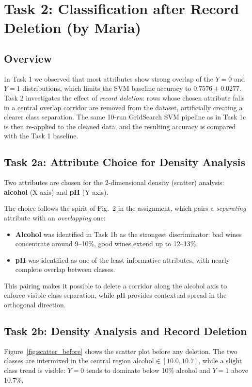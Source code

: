 \section{Task 2: Classification after Record Deletion (by Maria)}

\subsection{Overview}
In Task 1 we observed that most attributes show strong overlap of the
$Y = 0$ and $Y = 1$ distributions, which limits the SVM baseline
accuracy to $0.7576 \pm 0.0277$. Task 2 investigates the effect of
\emph{record deletion}: rows whose chosen attribute falls in a central
overlap corridor are removed from the dataset, artificially creating
a clearer class separation. The same 10-run GridSearch SVM pipeline as
in Task 1c is then re-applied to the cleaned data, and the resulting
accuracy is compared with the Task 1 baseline.

\subsection{Task 2a: Attribute Choice for Density Analysis}
Two attributes are chosen for the 2-dimensional density (scatter)
analysis: \textbf{alcohol} (X axis) and \textbf{pH} (Y axis).

The choice follows the spirit of Fig.~2 in the assignment, which pairs
a \emph{separating} attribute with an \emph{overlapping} one:
\begin{itemize}
    \item \textbf{Alcohol} was identified in Task 1b as the strongest
    discriminator: bad wines concentrate around 9--10\%, good wines
    extend up to 12--13\%.
    \item \textbf{pH} was identified as one of the least informative
    attributes, with nearly complete overlap between classes.
\end{itemize}
This pairing makes it possible to delete a corridor along the alcohol
axis to enforce visible class separation, while pH provides
contextual spread in the orthogonal direction.

\subsection{Task 2b: Density Analysis and Record Deletion}
Figure~\ref{fig:scatter_before} shows the scatter plot before any
deletion. The two classes are intermixed in the central region
$\text{alcohol} \in [10.0, 10.7]$, while a slight class trend is
visible: $Y = 0$ tends to dominate below 10\% alcohol and $Y = 1$
above 10.7\%.

